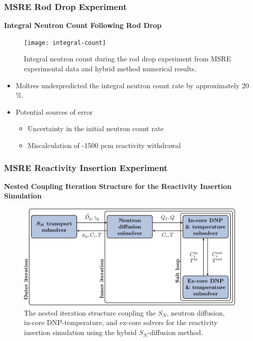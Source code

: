 \begin{frame}
  \frametitle{MSRE Rod Drop Experiment}
  \textbf{Integral Neutron Count Following Rod Drop}
  \begin{figure}[t]
    \centering
    \texttt{[image: integral-count]}
    \caption{Integral neutron count during the rod drop experiment from \gls{MSRE} experimental data
    and hybrid method numerical results.}
    \label{fig:integral-count}
  \end{figure}
  \begin{itemize}
    \item Moltres underpredicted the integral neutron count rate by approximately 20 \%.
    \item Potential sources of error
    \begin{itemize}
      \item Uncertainty in the initial neutron count rate
      \item Miscalculation of -1500 pcm reactivity withdrawal
    \end{itemize}
  \end{itemize}
\end{frame}

\begin{frame}
  \frametitle{MSRE Reactivity Insertion Experiment}
  \textbf{Nested Coupling Iteration Structure for the Reactivity Insertion Simulation}
  \begin{figure}[t]
    \centering
    \includegraphics[width=\columnwidth]{images/nest-2}
    \caption{The nested iteration structure coupling the $S_N$, neutron diffusion,
    in-core \gls{DNP}-temperature, and ex-core
    solvers for the reactivity insertion simulation using the hybrid $S_N$-diffusion method.}
    \label{fig:insertion-coupling}
  \end{figure}
\end{frame}
